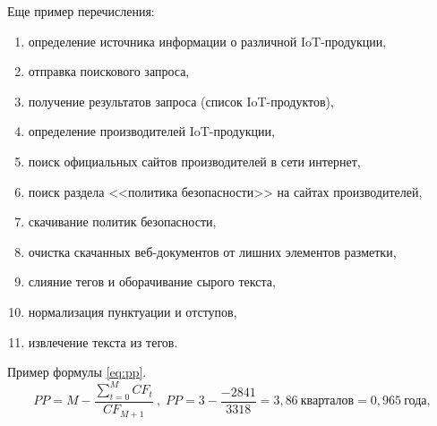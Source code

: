 \documentclass[../main]{subfiles}
\begin{document}
Еще пример перечисления:
\begin{enumerate}
    \item определение источника информации о различной IoT-продукции,
    \item отправка поискового запроса,
    \item получение результатов запроса (список IoT-продуктов),
    \item определение производителей IoT-продукции,
    \item поиск официальных сайтов производителей в сети интернет,
    \item поиск раздела <<политика безопасности>> на сайтах производителей,
    \item скачивание политик безопасности,
    \item очистка скачанных веб-документов от лишних элементов разметки,
    \item слияние тегов и оборачивание сырого текста,
    \item нормализация пунктуации и отступов,
    \item извлечение текста из тегов.
\end{enumerate}

Пример формулы \ref{eq:pp}.
\begin{equation}
    \label{eq:pp}
    PP = M - \frac{\sum^{M}_{t=0}CF_t}{CF_{M+1}}\ ,\; PP = 3 - \frac{-2 841}{3 318} = 3{,}86\:\text{кварталов} = 0,965\:\text{года},
\end{equation}
\end{document}
